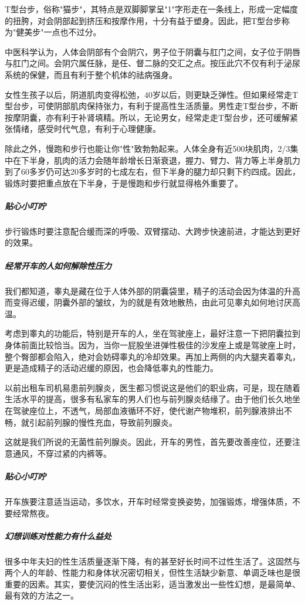 T型台步，俗称"猫步"，其特点是双脚脚掌呈"1"字形走在一条线上，形成一定幅度的扭胯，对会阴部起到挤压和按摩作用，十分有益于塑身。因此，把T型台步称为"健美步"一点也不过分。

中医科学认为，人体会阴部有个会阴穴，男子位于阴囊与肛门之间，女子位于阴唇与肛门之间。会阴穴属任脉，是任、督二脉的交汇之点。按压此穴不仅有利于泌尿系统的保健，而且有利于整个机体的祛病强身。

女性生孩子以后，阴道肌肉变得松弛，40岁以后，则更缺乏弹性。但如果经常走T型台步，可使阴部肌肉保持张力，有利于提高性生活质量。男性走T型台步，不断按摩阴囊，亦有利于补肾填精。所以，无论男女，经常走走T型台步，还可缓解紧张情绪，感受时代气息，有利于心理健康。

除此之外，慢跑和步行也能让你"性"致勃勃起来。人体全身有近500块肌肉，2/3集中在下半身，肌肉的活力会随年龄增长日渐衰退，握力、臂力、背力等上半身肌力到了60多岁仍可达20多岁时的七成左右，但下半身的腿力却只剩下约四成。因此，锻炼时要把重点放在下半身，于是慢跑和步行就显得格外重要了。

\subparagraph{贴心小叮咛}

步行锻炼时要注意配合缓而深的呼吸、双臂摆动、大跨步快速前进，才能达到更好的效果。

\subparagraph{经常开车的人如何解除性压力}

我们都知道，睾丸是藏在位于人体外部的阴囊袋里，精子的活动会因为体温的升高而变得迟缓，阴囊外部的皱纹，为的就是有效地散热，由此可见睾丸如何地讨厌高温。

考虑到睾丸的功能后，特别是开车的人，坐在驾驶座上，最好注意一下把阴囊拉到身体前面比较恰当。因为，当你一屁股坐进弹性极佳的沙发座上或是驾驶座上时，整个臀部都会陷入，绝对会妨碍睾丸的冷却效果。再加上两侧的内大腿夹着睾丸，更是造成精子的活动迟缓的原因，也会降低睾丸的性能力。

以前出租车司机易患前列腺炎，医生都习惯说这是他们的职业病，可是，现在随着生活水平的提高，很多有私家车的男人们也与前列腺炎结缘了。由于他们长久地坐在驾驶座位上，不透气，局部血液循环不好，使代谢产物堆积，前列腺液排出不畅，就引起前列腺的慢性充血，导致前列腺炎。

这就是我们所说的无菌性前列腺炎。因此，开车的男性，首先要改善座位，还要注意通风，不穿过紧的内裤等。

\subparagraph{贴心小叮咛}

开车族要注意适当运动，多饮水，开车时经常变换姿势，加强锻炼，增强体质，不要经常熬夜。

\subparagraph{幻想训练对性能力有什么益处}

很多中年夫妇的性生活质量逐渐下降，有的甚至好长时间不过性生活了。这固然与两个人的年龄、性能力和身体状况密切相关，但性生活缺少新意、单调乏味也是很重要的因素。其实，要使沉闷的性生活出彩，适当激发出一些性幻想，是最简单、最有效的方法之一。

